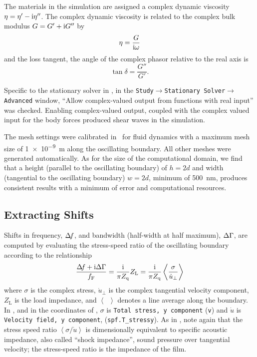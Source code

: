 The materials in the simulation are assigned a complex dynamic viscosity
$\eta = \eta'-{\mathrm{i}}\eta''$.  The complex dynamic viscosity is related to the complex bulk modulus
$G=G'+{\mathrm{i}} G''$ by
\begin{align}
 \eta = \frac{G}{{\mathrm{i}} \omega}
\end{align}
and the loss tangent, the angle of the complex phasor relative to the real axis is
\begin{equation}
 \tan \delta = \frac{G''}{G'}.
\end{equation}

Specific to the stationary solver in \comsol, in the
\texttt{Study$\rightarrow$Stationary Solver$\rightarrow$Advanced} window,
``Allow complex-valued output from functions with real input'' was checked.
Enabling complex-valued output, coupled with the complex valued input for
the body forces produced shear waves in the simulation.

The mesh settings were calibrated in \comsol~for fluid dynamics with a
maximum mesh size of \SI{1e-9}{\meter} along the oscillating boundary.  All
other meshes were generated automatically.  As for the size of the
computational domain, we find that a height (parallel to the oscillating
boundary) of $h=2d$ and width (tangential to the oscillating boundary)  
$w=2d$, minimum of \SI{500}{\nano\meter}, produces consistent results with a
minimum of error and computational resources.


\subsection{Extracting Shifts}
Shifts in frequency, $\Delta\!f$, and bandwidth (half-width at half maximum),
$\Delta\Gamma$, are computed by evaluating the stress-speed ratio of the oscillating
boundary according to the relationship
\begin{equation}
 \frac{\Delta\!f+{\mathrm{i}}\Delta\Gamma}{f_{\mathrm{F}}}=\frac{{\mathrm{i}}}{\pi
									Z_{\mathrm{q}}}Z_\mathrm{L} =\frac{{\mathrm{i}}}{\pi
																	Z_{\mathrm{q}}}\left<\frac{\sigma}{\dot{u}_\perp}\right>
\label{eqn:comsolextracttwo}
\end{equation}
where $\sigma$ is the complex stress, $\dot{u}_\perp$ is the complex
tangential velocity component, $Z_\mathrm{L}$ is the load impedance, and $\left<\enspace\right>$
denotes a line average along the boundary.  In \comsol, and in the
coordinates of , $\sigma$ is \texttt{Total stress,
y component} (\texttt{v}) and $\dot{u}$ is \texttt{Velocity field, y
component}, (\texttt{spf.T\_stressy}).  As in ,
note again that the stress speed ratio $\left<\sigma/\dot{u}\right>$
is dimensionally equivalent to specific acoustic impedance, also called
``shock impedance'', sound pressure over tangential velocity; the
stress-speed ratio is the impedance of the film. 

